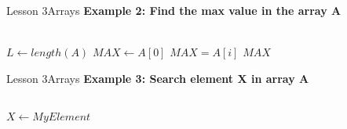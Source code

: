 \documentclass[aspectratio=1610]{beamer}
\begin{document}
\begin{frame}{Lesson 3}{Arrays}
\Large
\textbf{Example 2: Find the max value in the array A}\\~\\


\label{MaxArray}
\begin{algorithmic}[1]
 
\State $L\gets length(A)$
\State $MAX\gets A[0]$
    \State \textbf{$MAX = A[i]$} 
\EndIf
\EndFor
\State \Return $MAX$
\EndProcedure
\end{algorithmic}
\end{frame}



\begin{frame}{Lesson 3}{Arrays}
\Large
\textbf{Example 3: Search element X in array A}\\~\\
\label{SearchArray}
\begin{algorithmic}[1]
 
\State $X\gets MyElement$
    \State {}  
\EndIf
\EndFor
\State {} 
\EndProcedure
\end{algorithmic}
\end{frame}
\end{document}
